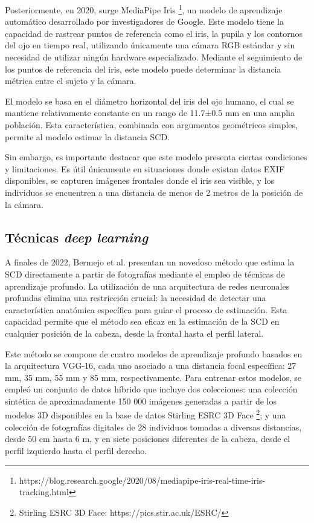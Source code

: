 Posteriormente, en 2020, surge MediaPipe Iris \footnote{https://blog.research.google/2020/08/mediapipe-iris-real-time-iris-tracking.html}, un modelo de aprendizaje automático desarrollado por investigadores de Google. Este modelo tiene la capacidad de rastrear puntos de referencia como el iris, la pupila y los contornos del ojo en tiempo real, utilizando únicamente una cámara RGB estándar y sin necesidad de utilizar ningún hardware especializado. Mediante el seguimiento de los puntos de referencia del iris, este modelo puede determinar la distancia métrica entre el sujeto y la cámara.

El modelo se basa en el diámetro horizontal del iris del ojo humano, el cual se mantiene relativamente constante en un rango de 11.7±0.5 mm en una amplia población. Esta característica, combinada con argumentos geométricos simples, permite al modelo estimar la distancia SCD.

Sin embargo, es importante destacar que este modelo presenta ciertas condiciones y limitaciones. Es útil únicamente en situaciones donde existan datos EXIF disponibles, se capturen imágenes frontales donde el iris sea visible, y los individuos se encuentren a una distancia de menos de 2 metros de la posición de la cámara.

\subsection{Técnicas \textit{deep learning}}

A finales de 2022, Bermejo et al. \cite{14} presentan un novedoso método que estima la SCD directamente a partir de fotografías mediante el empleo de técnicas de aprendizaje profundo. La utilización de una arquitectura de redes neuronales profundas elimina una restricción crucial: la necesidad de detectar una característica anatómica específica para guiar el proceso de estimación. Esta capacidad permite que el método sea eficaz en la estimación de la SCD en cualquier posición de la cabeza, desde la frontal hasta el perfil lateral.

Este método se compone de cuatro modelos de aprendizaje profundo basados en la arquitectura VGG-16, cada uno asociado a una distancia focal específica: 27 mm, 35 mm, 55 mm y 85 mm, respectivamente. Para entrenar estos modelos, se empleó un conjunto de datos híbrido que incluye dos colecciones: una colección sintética de aproximadamente 150 000 imágenes generadas a partir de los modelos 3D disponibles en la base de datos Stirling ESRC 3D Face \footnote{Stirling ESRC 3D Face: https://pics.stir.ac.uk/ESRC/}; y una colección de fotografías digitales de 28 individuos tomadas a diversas distancias, desde 50 cm hasta 6 m, y en siete posiciones diferentes de la cabeza, desde el perfil izquierdo hasta el perfil derecho.

